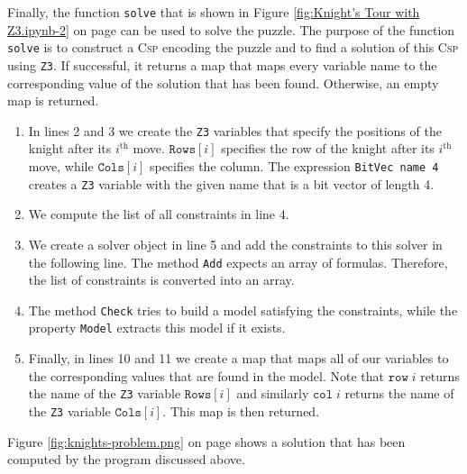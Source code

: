 Finally, the function \texttt{solve} that is shown in Figure \ref{fig:Knight's Tour with Z3.ipynb-2} on page
\pageref{fig:Knight's Tour with Z3.ipynb-2} can be used to solve the puzzle.
The purpose of the function \texttt{solve} is to construct a \textsc{Csp} encoding the puzzle and to find a
solution of this \textsc{Csp} using \texttt{Z3}.
If successful, it returns a map that maps every variable name to the corresponding value of the solution
that has been found.  Otherwise, an empty map is returned.
\begin{enumerate}
\item In lines 2 and 3 we create the \texttt{Z3} variables that specify the positions of the knight after its
      $i^{\mathrm{th}}$ move.  $\texttt{Rows}[i]$ specifies the row of the knight after its
      $i^{\mathrm{th}}$ move, while $\texttt{Cols}[i]$ specifies the column.  The expression
      \texttt{BitVec name 4} creates a \texttt{Z3} variable with the given name that is a bit vector of length 4.
\item We compute the list of all constraints in line 4.   
\item We create a solver object in line 5 and add the constraints to this solver in the following line.
      The method \texttt{Add} expects an array of formulas.  Therefore, the list of constraints is
      converted into an array.
\item The method \texttt{Check} tries to build a model satisfying the constraints, while the property
      \texttt{Model} extracts this model if it exists.
\item Finally, in lines 10 and 11 we create a map that maps all of our variables to the corresponding
      values that are found in the model.  Note that $\texttt{row}\;i$ returns the name of the
      \texttt{Z3} variable $\texttt{Rows}[i]$ and similarly $\mathtt{col}\;i$ returns the name of the
      \texttt{Z3} variable $\texttt{Cols}[i]$.
      This map is then returned.
\end{enumerate}
Figure \ref{fig:knights-problem.png} on page \pageref{fig:knights-problem.png} shows a solution that has been
computed by the program discussed above.






